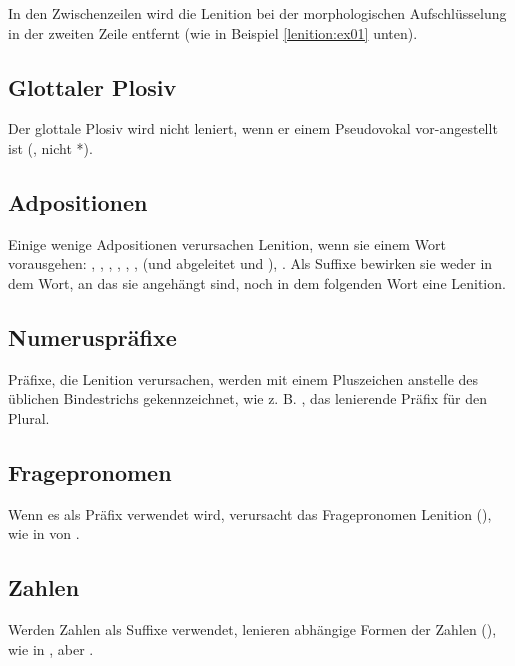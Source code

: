 \noindent In den Zwischenzeilen wird die Lenition bei der morphologischen Aufschlüsselung in der zweiten Zeile entfernt (wie in Beispiel \ref{lenition:ex01} unten).

\subsection{Glottaler Plosiv} Der glottale Plosiv wird nicht leniert, wenn er einem Pseudovokal vor-angestellt ist (, nicht *).
\label{lands:lenition:pseudovowel}

\subsection{Adpositionen} Einige wenige Adpositionen verursachen Lenition, wenn sie einem Wort vorausgehen: , , , , , ,  (und abgeleitet  und ), . Als Suffixe bewirken sie weder in dem Wort, an das sie angehängt sind, noch in dem folgenden Wort eine Lenition.

\subsection{Numeruspräfixe} Präfixe, die Lenition verursachen, werden mit einem Pluszeichen anstelle des üblichen Bindestrichs gekennzeichnet, wie z. B. , das lenierende Präfix für den Plural.

\subsection{Fragepronomen} Wenn es als Präfix verwendet wird, verursacht das Fragepronomen  Lenition (), wie in   von  .

\subsection{Zahlen}
Werden Zahlen als Suffixe verwendet, lenieren abhängige Formen der Zahlen (), wie in  , aber  .


